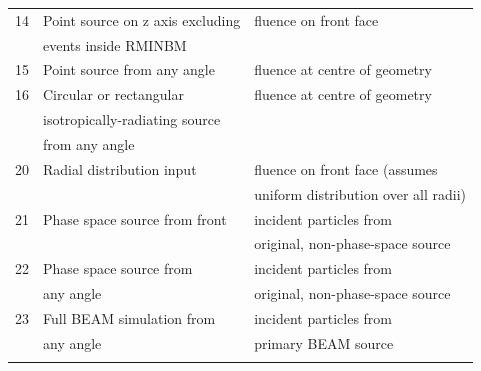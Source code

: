 \documentclass[12pt,twoside]{article}  %
\begin{document}
\begin{latexonly}
\begin{longtable}{lll}
\hline
14 & Point source on z axis excluding & fluence on front face\\
   & events inside RMINBM                 & \\
\hline
15 & Point source from any angle & fluence at centre of geometry\\
\hline
16 & Circular or rectangular & fluence at centre of geometry\\ 
   & isotropically-radiating source & \\
   & from any angle  &\\
\hline
20 & Radial distribution input & fluence on front face (assumes\\
   &                           & uniform distribution over all radii)\\
\hline
21 & Phase space source from front & incident particles from\\
   &                               & original, non-phase-space source\\
\hline
22 & Phase space source from   & incident particles from\\
   & any angle  & original, non-phase-space source\\ 
\hline
23 & Full BEAM simulation from   & incident particles from\\
   & any angle  & primary BEAM source\\
\label{normtable}
\end{longtable}
\end{latexonly}
\end{document}
